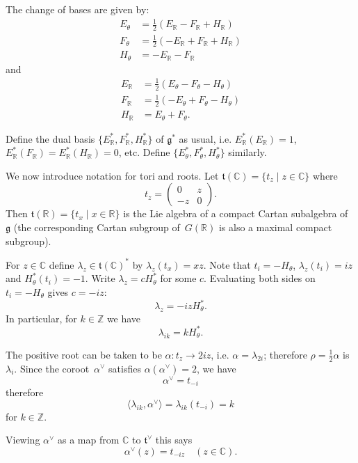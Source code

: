 \documentclass[10pt,leqno]{article}
\numberwithin{equation}{section}
\newcommand{\R}{\mathbb R}
\newcommand{\C}{\mathbb C}
\newcommand{\Z}{\mathbb Z}
\newcommand{\ch}[1]{#1^\vee}
\renewcommand{\t}{\mathfrak t}
\newcommand{\g}{\mathfrak g}
\begin{document}
The change of bases are given by:
$$
\begin{aligned}
  E_\theta&=\frac12(E_\R-F_\R+H_\R)\\
  F_\theta&=\frac12(-E_\R+F_\R+H_\R)\\
  H_\theta&=-E_\R-F_\R
\end{aligned}
$$
and
$$
\begin{aligned}
  E_\R&=\frac12(E_\theta-F_\theta-H_\theta)\\
  F_\R&=\frac12(-E_\theta+F_\theta-H_\theta)\\
  H_\R&=E_\theta+F_\theta.
\end{aligned}
$$

Define the dual basis
 $\{E_\R^*,F_\R^*,H_\R^*\}$ of $\g^*$ as usual,  i.e. $E_\R^*(E_\R)=1$, $E_\R^*(F_\R)=E_\R^*(H_\R)=0$, etc. Define 
 $\{E_\theta^*,F_\theta^*,H_\theta^*\}$ similarly.
 
\medskip


We now introduce notation for tori and roots. Let $\t(\C)=\{t_z\mid z\in\C\}$ where
$$
t_z=\begin{pmatrix}0&z\\-z&0
\end{pmatrix}.
$$
Then $\t(\R)=\{t_x\mid x\in\R\}$ is the Lie algebra of a compact Cartan subalgebra of $\g$ (the corresponding Cartan subgroup of~$G(\R)$ is also a maximal compact subgroup).




For $z\in \C$ define $\lambda_z\in \t(\C)^*$ by $\lambda_z(t_x)=xz$.
Note that $t_i=-H_\theta$, $\lambda_z(t_i)=iz$ and $H_\theta^*(t_i)=-1$.
Write $\lambda_z=cH_\theta^*$ for some $c$. Evaluating both sides on $t_i=-H_\theta$ gives
$c=-iz$:
\begin{equation}
\label{e:lambdaz}
\lambda_z=-izH_\theta^*.
\end{equation}
In particular, for $k \in \Z$ we have
\begin{equation}
\label{e:lambdai}
\lambda_{ik}=kH_\theta^*.
\end{equation}


The positive root can be taken to be   $\alpha\colon t_z \to 2iz$, i.e.
$\alpha=\lambda_{2i}$; therefore $\rho=\frac12\alpha$ is~$\lambda_i$.
Since the coroot~$\ch\alpha$ satisfies $\alpha(\ch\alpha)=2$, we have
$$
\ch\alpha=t_{-i}
$$
therefore
$$
\langle \lambda_{ik},\ch\alpha\rangle=\lambda_{ik}(t_{-i})=k
$$
for $k \in \Z$. 

Viewing $\ch\alpha$ as a map from $\C$ to $\ch{\mathfrak t}$ this says
$$
\ch\alpha(z)=t_{-iz}\quad (z\in \C).
$$
\end{document}
